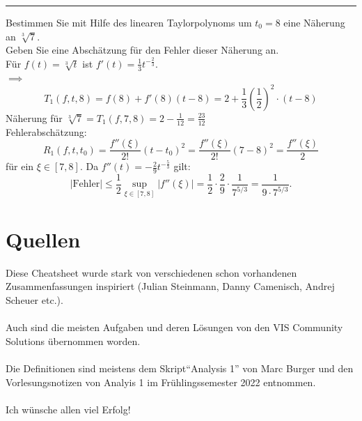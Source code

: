 \documentclass[a4paper,fontsize = 7pt]{scrartcl}
\begin{document}
\vspace{0.1 cm}
\hrule
\vspace{0.2 cm}

Bestimmen Sie mit Hilfe des linearen Taylorpolynoms um $t_0 = 8$ eine Näherung
an $\sqrt[3]{7}$.
\\Geben Sie eine Abschätzung für den Fehler dieser Näherung an.
\\Für $f(t) = \sqrt[3]{t}$ ist $f'(t) = \frac{1}{3}t^{-\frac{2}{3}}$.
\\$\implies$ 
$$T_1(f, t, 8) = f(8) + f'(8)(t - 8) = 2 + \frac{1}{3}\left(\frac{1}{2}\right)^2 \cdot (t- 8)$$ 
Näherung für $\sqrt[3]{7} = T_1(f, 7, 8) = 2 - \frac{1}{12} = \frac{23}{12}$
\\Fehlerabschätzung:
$$R_1(f, t, t_0) = \frac{f''(\xi)}{2!}(t - t_0)^2 = \frac{f''(\xi)}{2!}(7-8)^2 = \frac{f''(\xi)}{2}$$
für ein $\xi \in [7, 8]$.
Da $f''(t) =-\frac{2}{9} t^{-\frac{5}{3}}$ gilt:
$$|\text{Fehler}| \leq \frac{1}{2} \sup_{\xi \in [7, 8]} |f''(\xi)| = \frac{1}{2}\cdot \frac{2}{9} \cdot \frac{1}{7^{5/3}} = \frac{1}{9 \cdot 7^{5/3}}.$$

\section{Quellen}
Diese Cheatsheet wurde stark von verschiedenen schon vorhandenen Zusammenfassungen inspiriert (Julian Steinmann, Danny Camenisch, Andrej Scheuer etc.). 
\\ \\
Auch sind die meisten Aufgaben und deren Lösungen von den VIS Community Solutions übernommen worden.
\\ \\
Die Definitionen sind meistens dem Skript“Analysis 1” von Marc Burger und den Vorlesungsnotizen von Analyis 1 im Frühlingssemester 2022 entnommen.
\\ \\
Ich wünsche allen viel Erfolg!
\end{document}

